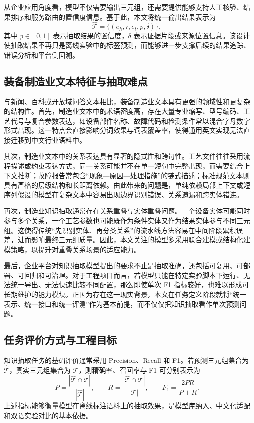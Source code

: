 从企业应用角度看，模型不仅需要输出三元组，还需要提供能够支持人工核验、结果排序和服务路由的置信度信息。基于此，本文将统一输出结果表示为
\begin{equation}
\hat{\mathcal{T}}=\{(e_h,r,e_t,p,\delta)\},
\end{equation}
其中 $p\in[0,1]$ 表示抽取结果的置信度，$\delta$ 表示证据片段或来源位置信息。该设计使抽取结果不再只是离线实验中的标签预测，而能够进一步支撑后续的结果追踪、错误分析和平台侧回溯。

\subsection{装备制造业文本特征与抽取难点}
与新闻、百科或开放域问答文本相比，装备制造业文本具有更强的领域性和更复杂的结构性。首先，制造业文本中的术语密度高，存在大量专业缩写、型号编码、工艺代号与复合参数表达，如设备部件名称、故障代码和检测条件常以混合字母数字形式出现。这一特点会直接影响分词效果与词表覆盖率，使得通用英文实现无法直接迁移到中文行业语料中。

其次，制造业文本中的关系表达具有显著的隐式性和跨句性。工艺文件往往采用流程描述或约束表达方式，同一关系可能并不在单一短句中完整出现，而需要结合上下文推断；故障报告常包含“现象—原因—处理措施”的链式描述；标准规范文本则具有严格的层级结构和长距离依赖。由此带来的问题是，单纯依赖局部上下文或短序列假设的模型在复杂文本中容易出现边界识别错误、关系遗漏和跨实体错连。

再次，制造业知识抽取通常存在关系重叠与实体重叠问题。一个设备实体可能同时参与多个关系，一个工艺参数也可能既作为条件实体又作为结果实体参与不同三元组。这使得传统“先识别实体、再分类关系”的流水线方法容易在中间阶段累积误差，进而影响最终三元组质量。因此，本文关注的模型多采用联合建模或结构化建模策略，以提升对重叠关系场景的适应能力\cite{bekoulis2018,casrel2020,tplinker2020,onerel2022}。

最后，企业平台对知识抽取模型提出的要求不止是抽取准确，还包括可复用、可部署、可回归和可治理。对于工程项目而言，若模型只能在特定实验脚本下运行、无法统一导出、无法快速比较不同配置，那么即使单次 F1 指标较好，也难以形成可长期维护的能力模块。正因为存在这一现实背景，本文在任务定义阶段就将“统一表示、统一接口和统一评测”作为基本前提，而不仅仅把知识抽取看作单次预测问题。

\subsection{任务评价方式与工程目标}
知识抽取任务的基础评价通常采用 Precision、Recall 和 F1。若预测三元组集合为 $\hat{\mathcal{T}}$，真实三元组集合为 $\mathcal{T}$，则精确率、召回率与 F1 可分别表示为
\begin{equation}
P=\frac{|\hat{\mathcal{T}}\cap\mathcal{T}|}{|\hat{\mathcal{T}}|},\qquad
R=\frac{|\hat{\mathcal{T}}\cap\mathcal{T}|}{|\mathcal{T}|},\qquad
F_{1}=\frac{2PR}{P+R}.
\end{equation}
上述指标能够衡量模型在离线标注语料上的抽取效果，是模型库纳入、中文化适配和双语实验对比的基本依据。


